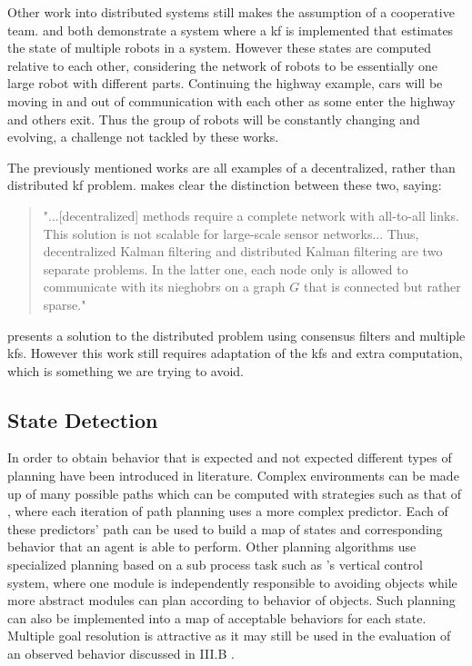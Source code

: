 \documentclass[conference]{IEEEtran}
\begin{document}
Other work into distributed systems still makes the assumption of a cooperative team. \cite{Sanderson1997} and \cite{Roumeliotis2002} both demonstrate a system where a \gls{kf} is implemented that estimates the state of multiple robots in a system. However these states are computed relative to each other, considering the network of robots to be essentially one large robot with different parts. Continuing the highway example, cars will be moving in and out of communication with each other as some enter the highway and others exit. Thus the group of robots will be constantly changing and evolving, a challenge not tackled by these works.

The previously mentioned works are all examples of a decentralized, rather than distributed \gls{kf} problem. \cite{Olfati-Saber2005} makes clear the distinction between these two, saying:
\begin{quote}"...[decentralized] methods require a complete network with all-to-all links. This solution is not scalable for large-scale sensor networks... Thus, decentralized Kalman filtering and distributed Kalman filtering are two separate problems. In the latter one, each node only is allowed to communicate with its nieghobrs on a graph $G$ that is connected but rather sparse."
\end{quote}
\cite{Olfati-Saber2005} presents a solution to the distributed problem using consensus filters and multiple \glspl{kf}. However this work still requires adaptation of the \glspl{kf} and extra computation, which is something we are trying to avoid.

\subsection{State Detection}

In order to obtain behavior that is expected and not expected different types of planning have been introduced in literature. Complex environments can be made up of many possible paths which can be computed with strategies such as that of \cite{tallavajhulalist}, where each iteration of path planning uses a more complex predictor. Each of these predictors' path can be used to build a map of states and corresponding behavior that an agent is able to perform. 
Other planning algorithms use specialized planning based on a sub process task such as \cite{bridge2008robust}'s vertical control system, where one module is independently responsible to avoiding objects while more abstract modules can plan according to behavior of objects. Such planning can also be implemented into a map of acceptable behaviors for each state. Multiple goal resolution is attractive as it may still be used in the evaluation of an observed behavior discussed in III.B .
\end{document}
